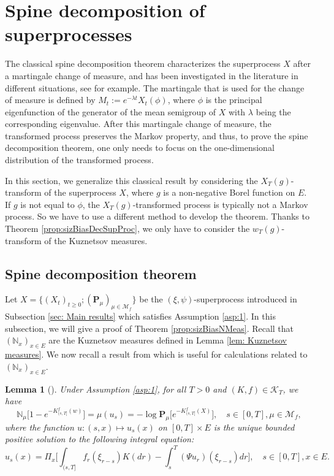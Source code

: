 \documentclass[UTF8]{pkuthss}
\theoremstyle{plain}
\newtheorem{lem}[thm]{Lemma}
\theoremstyle{definition}
\numberwithin{equation}{section}
\begin{document}
\section{Spine decomposition of superprocesses}
	The  classical spine decomposition theorem characterizes the superprocess  $X$ after a martingale change of measure, and has been investigated in the literature in different situations, see \cite{EckhoffKyprianouWinkel2015Spines, EnglanderKyprianou2004Local, LiuRenSong2009Log} for example.
	The martingale that is used for the change of measure is defined by $M_t := e^{-\lambda t}X_t(\phi)$, where $\phi$ is the principal eigenfunction of the generator of the mean semigroup of $X$ with $\lambda$ being the corresponding eigenvalue.
	After this martingale change of measure, the transformed process preserves the Markov property, and thus, to prove the spine decomposition theorem, one only needs to focus on the one-dimensional distribution of the transformed process.
\par
	In this section, we generalize this classical result by considering the $X_T(g)$-transform of the superprocess $X$, where $g$ is a non-negative Borel function on $E$.
	If $g$ is not equal to $\phi$, the $X_T(g)$-transformed process is typically not a Markov process.
	So we have to use a different method to develop the theorem.
	Thanks to Theorem \ref{prop:sizBiasDecSupProc},
	we only have to consider the $w_T(g)$-transform of the Kuznetsov measures.
\subsection{Spine decomposition theorem}
	Let $X=\{(X_t)_{t\geq 0}; (\mathbf P_\mu)_{\mu \in \mathcal M_f}\}$ be the $(\xi,\psi)$-superprocess introduced in Subsection \ref{sec: Main results} which satisfies Assumption \ref{asp:1}.
	In this subsection, we will give a proof of Theorem \ref{prop:sizBiasNMeas}.
	Recall that $(\mathbb N_x)_{x\in E}$ are the Kuznetsov measures defined in Lemma \ref{lem: Kuznetsov measures}. We now recall a result from \cite{Li2011MeasureValued} which is useful for calculations related to $(\mathbb N_x)_{x\in E}$.
\begin{lem}[{\cite[Theorems 5.15 and 8.23]{Li2011MeasureValued}}]\label{lem:EquatDescNmeas}
	Under Assumption \ref{asp:1}, for all $T> 0$ and $(K,f) \in \mathcal K_T$, we have
\[
	\mathbb N_\mu \big[ 1 - e^{-K_{(s, T]}^f(w)} \big]
	= \mu(u_s)
	= -\log \mathbf P_{\mu} \big[ e^{-K_{(s, T]}^f(X)} \big],
	\quad s\in [0,T], \mu \in \mathcal M_f,
\]
	where the function $u: (s,x) \mapsto u_s(x)$ on $[0,T] \times E$ is the unique bounded positive solution to the following integral equation:
\[
	u_s(x)
    =\Pi_x \Big[\int_{(s,T]} f_r(\xi_{r-s}) K(dr) -
    \int_s^T (\Psi u_r)(\xi_{r-s}) dr \Big],
    \quad s \in [0,T], x \in E.
\]
\end{lem}
\end{document}
